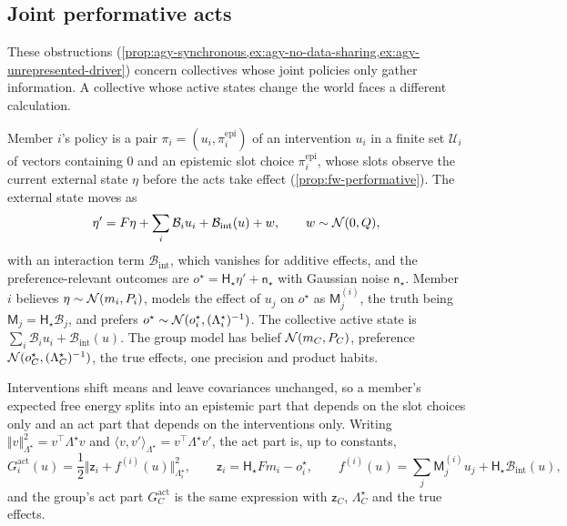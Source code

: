 \subsection{Joint performative acts}\label{sup:agy-joint-performative-acts}

These obstructions (\cref{prop:agy-synchronous,ex:agy-no-data-sharing,ex:agy-unrepresented-driver}) concern collectives whose joint policies only gather information. A collective whose active states change the world faces a different calculation.

\begin{definition}\label{def:agy-joint-acts}
Member $i$'s policy is a pair $\pi_i=(u_i,\pi^{\mathrm{epi}}_i)$ of an intervention $u_i$ in a finite set $\mathcal U_i$ of vectors containing $0$ and an epistemic slot choice $\pi^{\mathrm{epi}}_i$, whose slots observe the current external state $\eta$ before the acts take effect (\cref{prop:fw-performative}). The external state moves as
\begin{equation}\label{eq:agy-acts}
\eta'=F\eta+\sum_i\mathcal B_iu_i+\mathcal B_{\mathrm{int}}(u)+w,\qquad w\sim\mathcal{N}(0,Q),
\end{equation}
with an interaction term $\mathcal B_{\mathrm{int}}$, which vanishes for additive effects, and the preference-relevant outcomes are $o^\star=\mathsf H_\star\eta'+\mathsf n_\star$ with Gaussian noise $\mathsf n_\star$. Member $i$ believes $\eta\sim\mathcal{N}(m_i,P_i)$, models the effect of $u_j$ on $o^\star$ as $\mathsf M^{(i)}_j$, the truth being $\mathsf M_j=\mathsf H_\star\mathcal B_j$, and prefers $o^\star\sim\mathcal{N}(o^\star_i,(\Lambda^\star_i)^{-1})$. The collective active state is $\sum_i\mathcal B_iu_i+\mathcal B_{\mathrm{int}}(u)$. The group model has belief $\mathcal{N}(m_C,P_C)$, preference $\mathcal{N}(o^\star_C,(\Lambda^\star_C)^{-1})$, the true effects, one precision and product habits.
\end{definition}

Interventions shift means and leave covariances unchanged, so a member's expected free energy splits into an epistemic part that depends on the slot choices only and an act part that depends on the interventions only. Writing $\Vert v\Vert^2_{\Lambda^\star}=v^\top\Lambda^\star v$ and $\langle v,v'\rangle_{\Lambda^\star}=v^\top\Lambda^\star v'$, the act part is, up to constants,
\begin{equation}\label{eq:agy-act-efe}
G^{\mathrm{act}}_i(u)=\frac12\bigl\Vert\mathsf z_i+f^{(i)}(u)\bigr\Vert^2_{\Lambda^\star_i},\qquad\mathsf z_i=\mathsf H_\star Fm_i-o^\star_i,\qquad f^{(i)}(u)=\sum_j\mathsf M^{(i)}_ju_j+\mathsf H_\star\mathcal B_{\mathrm{int}}(u),
\end{equation}
and the group's act part $G^{\mathrm{act}}_C$ is the same expression with $\mathsf z_C$, $\Lambda^\star_C$ and the true effects.

